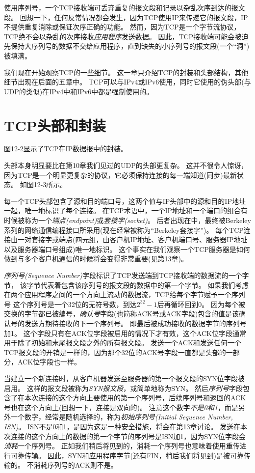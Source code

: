 \documentclass{../main.tex}{subfiles}
\begin{document}
使用序列号，一个TCP接收端可丢弃重复的报文段和记录以杂乱次序到达的报文段。
回想一下，任何反常情况都会发生，因为TCP使用IP来传递它的报文段，IP不提供重复消除或保证次序正确的功能。
然而，因为TCP是一个字节流协议，TCP绝不会以杂乱的次序接收\emph{应用程序}发送数据。
因此，TCP接收端可能会被迫先保持大序列号的数据不交给应用程序，直到缺失的小序列号的报文段(一个``洞'')被填满。

我们现在开始观察TCP的一些细节。
这一章只介绍TCP的封装和头部结构，其他细节出现在后面的五章中。
TCP可以与IPv4或IPv6使用，同时它使用的伪头部(与UDP的类似)在IPv4中和IPv6中都是强制使用的。

\section{TCP头部和封装}
图12-2显示了TCP在IP数据报中的封装。

头部本身明显要比在第10章我们见过的UDP的头部更复杂。
这并不很令人惊讶，因为TCP是一个明显更复杂的协议，它必须保持连接的每一端知道(同步)最新状态。
如图12-3所示。

每一个TCP头部包含了源和目的端口号，这两个值与IP头部中的源和目的IP地址一起，唯一地标识了每个连接。
在TCP术语中，一个IP地址和一个端口的组合有时候被称为一个\emph{端点(endpoint)}或\emph{套接字(socket)}。
后者出现在\cite{1981Transmission}中，最终被Berkeley系列的网络通信编程接口所采用(现在经常被称为``Berkeley套接字'')。
每个TCP连接由一对套接字或端点(四元组，由客户机IP地址、客户机端口号、服务器IP地址以及服务器端口号组成)唯一地标识。
这个事实在我们观察一个TCP服务器是如何做到与多个客户机通信的时候将会变得非常重要(见第13章)。

\emph{序列号(Sequence Number)}字段标识了TCP发送端到TCP接收端的数据流的一个字节，
该字节代表着包含该序列号的报文段的数据中的第一个字节。
如果我们考虑在两个应用程序之间的一个方向上流动的数据流，TCP给每个字节赋予一个序列号
这个序列号是一个32位的无符号数，到达$2^{32}-1$后再循环回到0。
因为每个被交换的字节都已被编号，\emph{确认号}字段(也简称ACK号或ACK字段)包含的值是该确认号的发送方期待接收的下一个序列号。
即最后被成功接收的数据字节的序列号加1。
这个字段只有在ACK位字段被启用的情况下才有效，这个ACK位字段通常用于除了初始和末尾报文段之外的所有报文段。
发送一个ACK和发送任何一个TCP报文段的开销是一样的，因为那个32位的ACK号字段一直都是头部的一部分，ACK位字段也一样。

当建立一个新连接时，从客户机器发送至服务器的第一个报文段的SYN位字段被启用。
这样的报文段被称为\emph{SYN报文段}，或简单地称为SYN。
然后\emph{序列号}字段包含了在本次连接的这个方向上要使用的第一个序列号，后续序列号和返回的ACK号也在这个方向上(回想一下，连接是双向的)。
注意这个数字\emph{不是0和1}，而是另外一个数字，经常是随机选择的，称为\emph{初始序列号(Initial Sequence
Number, ISN)}。
ISN不是0和1，是因为这是一种安全措施，将会在第13章讨论。
发送在本次连接的这个方向上的数据的第一个字节的序列号是ISN加1，因为SYN位字段会\emph{消耗}一个序列号。
正如我们稍后将见到的，消耗一个序列号也意味着使用重传进行可靠传输。
因此，SYN和应用程序字节(还有FIN，稍后我们将见到)是被可靠传输的。
不消耗序列号的ACK则不是。
\end{document}
